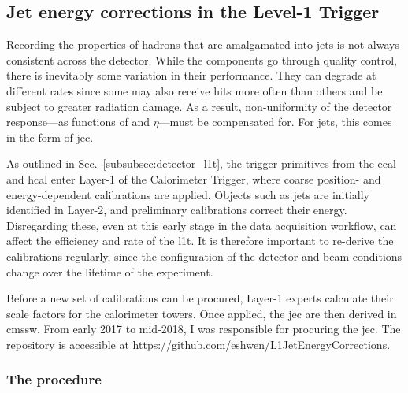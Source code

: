 

\subsection{Jet energy corrections in the Level-1 Trigger}
\label{subsec:detector_jecs}

Recording the properties of hadrons that are amalgamated into \glspl{jet} is not always consistent across the detector. While the components go through quality control, there is inevitably some variation in their performance. They can degrade at different rates since some may also receive hits more often than others and be subject to greater radiation damage. As a result, non-uniformity of the detector response---as functions of \pt and $\eta$---must be compensated for. For \glspl{jet}, this comes in the form of \gls{jec}.

As outlined in Sec.~\ref{subsubsec:detector_l1t}, the trigger primitives from the \acrshort{ecal} and \acrshort{hcal} enter Layer-1 of the Calorimeter Trigger, where coarse position- and energy-dependent calibrations are applied. Objects such as \glspl{jet} are initially identified in Layer-2, and preliminary calibrations correct their energy. Disregarding these, even at this early stage in the data acquisition workflow, can affect the efficiency and rate of the \acrlong{l1t}. It is therefore important to re-derive the calibrations regularly, since the configuration of the detector and beam conditions change over the lifetime of the experiment.

Before a new set of calibrations can be procured, Layer-1 experts calculate their scale factors for the calorimeter towers. Once applied, the \acrlong{jec} are then derived in \acrshort{cmssw}. From early 2017 to mid-2018, I was responsible for procuring the \acrshort{jec}. The repository is accessible at \url{https://github.com/eshwen/L1JetEnergyCorrections}.




\subsubsection{The procedure}
\label{subsubsec:detector_jec_procedure}

